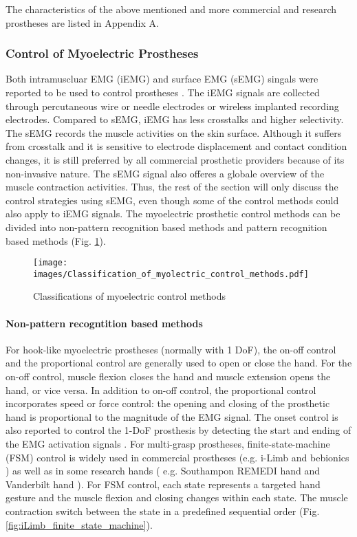 The characteristics of the above mentioned and more commercial and research prostheses are listed in Appendix A. 

\subsubsection{Control of Myoelectric Prostheses}
Both intramuscluar EMG (iEMG) and surface EMG (sEMG) singals were reported to be used to control prostheses \cite{smith2014real,kamavuako2009relationship,rafiee2011feature}. The iEMG signals are collected through percutaneous wire or needle electrodes or wireless implanted recording electrodes. Compared to sEMG, iEMG has less crosstalks and higher selectivity\cite{micera2010control}. The sEMG records the muscle activities on the skin surface. Although it suffers from crosstalk and it is sensitive to electrode displacement and contact condition changes, it is still preferred by all commercial prosthetic providers because of its non-invasive nature. The sEMG signal also offeres a globale overview of the muscle contraction activities. Thus, the rest of the section will only discuss the control strategies using sEMG, even though some of the control methods could also apply to iEMG signals.
The myoelectric prosthetic control methods can be divided into non-pattern recognition based methods and pattern recognition based methods (Fig. \ref{fig:myoelectric_control_classification_methods}). 

 \begin{figure}[ht!]
    \centering
        \texttt{[image: images/Classification\_of\_myolectric\_control\_methods.pdf]}
        \caption{Classifications of myoelectric control methods}
        \label{fig:myoelectric_control_classification_methods}
\end{figure}

\paragraph{Non-pattern recogntition based methods}
For hook-like myoelectric prostheses (normally with 1 DoF), the on-off control and the proportional control are generally used to open or close the hand. For the on-off control, muscle flexion closes the hand and muscle extension opens the hand, or vice versa.
In addition to on-off control, the proportional control incorporates speed or force control: the opening and closing of the prosthetic hand is proportional to the magnitude of the EMG signal.
The onset control is also reported to control the 1-DoF prosthesis by detecting the start and ending of the EMG activation signals \cite{staude2001onset}. 
For multi-grasp prostheses, finite-state-machine (FSM) control is widely used in commercial prostheses (e.g. i-Limb \cite{touchbionics_i_limb} and bebionics \cite{bebionic}) as well as in some research hands ( e.g. Southampon REMEDI hand \cite{cotton2006control} and Vanderbilt hand \cite{dalley2010multigrasp}). For FSM control, each state represents a targeted hand gesture and the muscle flexion and closing changes within each state. The muscle contraction switch between the state in a predefined sequential order (Fig. \ref{fig:iLimb_finite_state_machine}).
  
